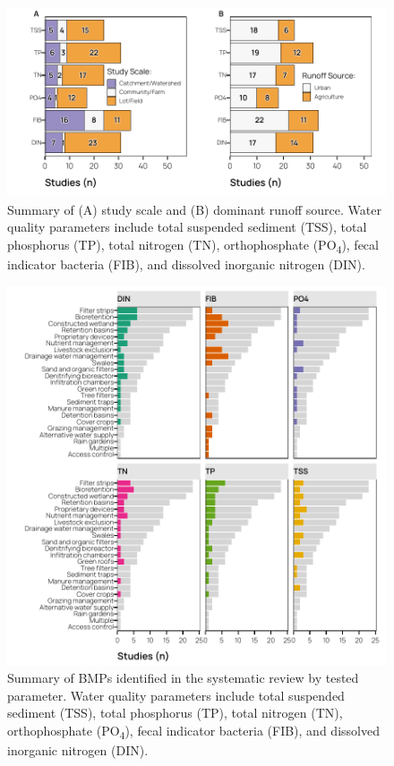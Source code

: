 \documentclass[utf8]{FrontiersinHarvard}
\begin{document}
\begin{figure}
\includegraphics[width=1\linewidth,]{frontiers_submission_revision_01_files/figure-latex/fig1} \caption{Summary of (A) study scale and (B) dominant runoff source. Water quality parameters include total suspended sediment (TSS), total phosphorus (TP), total nitrogen (TN), orthophosphate (PO\textsubscript{4}), fecal indicator bacteria (FIB), and dissolved inorganic nitrogen (DIN).}\label{fig:fig1}
\end{figure}

\begin{figure}
\includegraphics[width=1\linewidth,]{frontiers_submission_revision_01_files/figure-latex/fig2} \caption{Summary of BMPs identified in the systematic review by tested parameter. Water quality parameters include total suspended sediment (TSS), total phosphorus (TP), total nitrogen (TN), orthophosphate (PO\textsubscript{4}), fecal indicator bacteria (FIB), and dissolved inorganic nitrogen (DIN).}\label{fig:fig2}
\end{figure}
\end{document}
